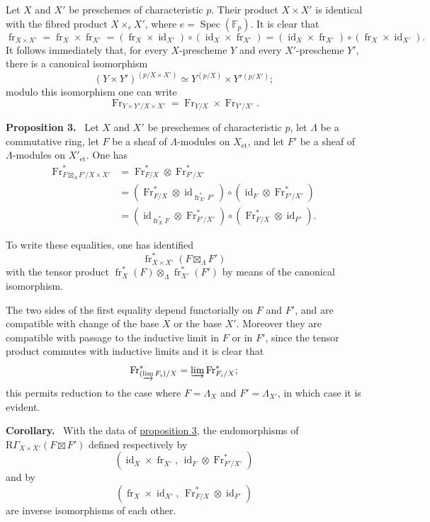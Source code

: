 \documentclass[11pt]{article}
\newenvironment{statement}[1]{\par\medskip\noindent\textbf{#1.}\ }{\par\medskip}
\DeclareMathOperator{\Spec}{Spec}
\providecommand{\et}{\mathrm{\acute{e}t}}
\providecommand{\RGamma}{\mathrm R\Gamma}
\providecommand{\id}{\operatorname{id}}
\providecommand{\id}{\operatorname{id}}
\providecommand{\id}{\operatorname{id}}
\providecommand{\RGamma}{\mathrm R\Gamma}
\providecommand{\id}{\operatorname{id}}
\providecommand{\Spec}{\operatorname{Spec}}
\providecommand{\Spec}{\operatorname{Spec}}
\providecommand{\id}{\operatorname{id}}
\providecommand{\Spec}{\operatorname{Spec}}
\providecommand{\fr}{\operatorname{fr}}
\providecommand{\Fr}{\operatorname{Fr}}
\providecommand{\Fr}{\operatorname{Fr}}
\providecommand{\fr}{\operatorname{fr}}
\providecommand{\Spec}{\operatorname{Spec}}
\providecommand{\id}{\operatorname{id}}
\providecommand{\RGamma}{\mathrm R\Gamma}
\providecommand{\et}{\acute{e}t}
\providecommand{\boxt}{\boxtimes}
\begin{document}
Let $X$ and $X'$ be preschemes of characteristic $p$. Their product $X\times X'$ is identical with the fibred product $X\times_eX'$, where $e=\Spec(\mathbb F_p)$. It is clear that
\[
\fr_{X\times X'}=\fr_X\times\fr_{X'}=(\fr_X\times\id_{X'})\circ(\id_X\times\fr_{X'})
=(\id_X\times\fr_{X'})\circ(\fr_X\times\id_{X'}).
\]
It follows immediately that, for every $X$-prescheme $Y$ and every $X'$-prescheme $Y'$, there is a canonical isomorphism
\[
(Y\times Y')^{(p/X\times X')}
\simeq Y^{(p/X)}\times Y'{}^{(p/X')};
\]
modulo this isomorphism one can write
\[
\Fr_{Y\times Y'/X\times X'}=\Fr_{Y/X}\times\Fr_{Y'/X'}.
\]

\label{sga5:XV:proposition:3}\begin{statement}{Proposition 3}
Let $X$ and $X'$ be preschemes of characteristic $p$, let $\Lambda$ be a commutative ring, let $F$ be a sheaf of $\Lambda$-modules on $X_{\et}$, and let $F'$ be a sheaf of $\Lambda$-modules on $X'_{\et}$. One has
\[
\begin{aligned}
\Fr^*_{F\boxt_\Lambda F'/X\times X'}
&=\Fr^*_{F/X}\otimes\Fr^*_{F'/X'}\\
&=(\Fr^*_{F/X}\otimes\id_{\fr_{X'}^*F'})
  \circ(\id_F\otimes\Fr^*_{F'/X'})\\
&=(\id_{\fr_X^*F}\otimes\Fr^*_{F'/X'})
  \circ(\Fr^*_{F/X}\otimes\id_{F'}).
\end{aligned}
\]
\end{statement}

To write these equalities, one has identified
\[
\fr_{X\times X'}^*(F\boxt_\Lambda F')
\]
with the tensor product $\fr_X^*(F)\otimes_\Lambda\fr_{X'}^*(F')$ by means of the canonical isomorphism.

The two sides of the first equality depend functorially on $F$ and $F'$, and are compatible with change of the base $X$ or the base $X'$. Moreover they are compatible with passage to the inductive limit in $F$ or in $F'$, since the tensor product commutes with inductive limits and it is clear that
\[
\Fr^*_{(\varinjlim F_i)/X}=\varinjlim\Fr^*_{F_i/X};
\]
this permits reduction to the case where $F=\Lambda_X$ and $F'=\Lambda_{X'}$, in which case it is evident.

\begin{statement}{Corollary}
With the data of \hyperref[sga5:XV:proposition:3]{proposition 3}, the endomorphisms of $\RGamma_{X\times X'}(F\boxt F')$ defined respectively by
\[
(\id_X\times\fr_{X'},\,\id_F\otimes\Fr^*_{F'/X'})
\]
and by
\[
(\fr_X\times\id_{X'},\,\Fr^*_{F/X}\otimes\id_{F'})
\]
are inverse isomorphisms of each other.
\end{statement}
\end{document}
